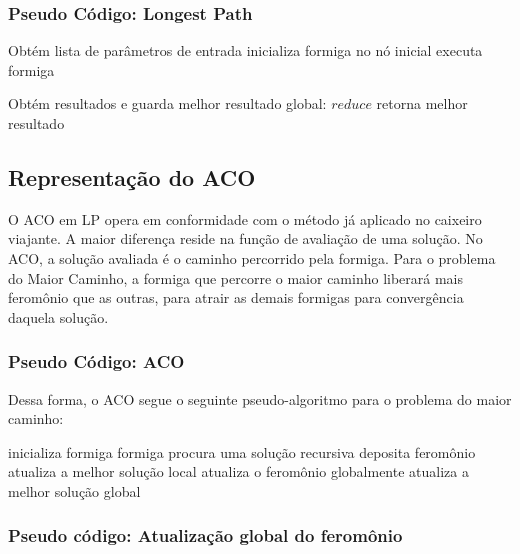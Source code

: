 \documentclass{article}
\begin{document}
\subsubsection{Pseudo Código: Longest Path}
 \begin{algorithmic}
 \STATE Obtém lista de parâmetros de entrada
 \STATE inicializa formiga no nó inicial 
 \STATE executa formiga

 \ENDFOR
  \STATE Obtém resultados e guarda melhor resultado global: $reduce$
 \ENDFOR
 \ENDFOR
 \STATE retorna melhor resultado
 \end{algorithmic}

\newpage
\subsection{Representação do ACO}
\par
O ACO em LP opera em conformidade com o método já aplicado no caixeiro viajante. A maior diferença reside na função de avaliação de uma solução. No ACO, a solução avaliada é o caminho percorrido pela formiga. Para o problema do Maior Caminho, a formiga que percorre o maior caminho liberará mais feromônio que as outras, para atrair as demais formigas para convergência daquela solução.
\newline
\par

\subsubsection{Pseudo Código: ACO}
Dessa forma, o ACO segue o seguinte pseudo-algoritmo para o problema do maior caminho:
\newline
\par
 \begin{algorithmic}
 \STATE inicializa formiga
 \STATE formiga procura uma solução recursiva
 \STATE deposita feromônio
 \STATE atualiza a melhor solução local
 \STATE atualiza o feromônio globalmente
 \ENDIF
 \ENDFOR
 \STATE atualiza a melhor solução global
 \ENDFOR
 \newline
 \end{algorithmic}

\subsubsection{Pseudo código: Atualização global do feromônio}
\end{document}
